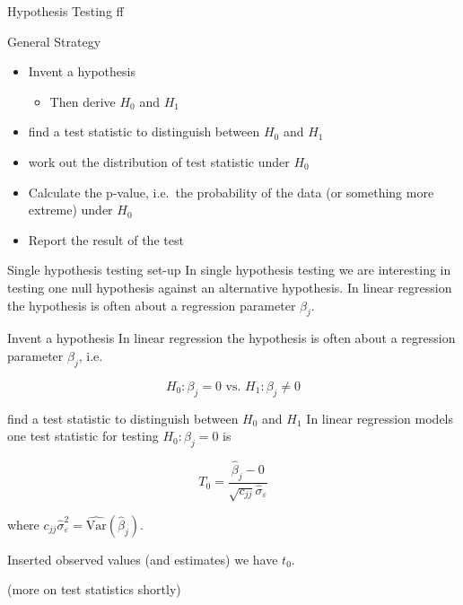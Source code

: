 \documentclass[
  ignorenonframetext,
]{beamer}
\providecommand{\tightlist}{%
  \setlength{\itemsep}{0pt}\setlength{\parskip}{0pt}}
\begin{document}
\begin{frame}{Hypothesis Testing}
\label{hypothesis-testing}
ff
\end{frame}

\begin{frame}{General Strategy}
\label{general-strategy}
\begin{itemize}
\tightlist
\item
  Invent a hypothesis

  \begin{itemize}
  \tightlist
  \item
    Then derive \(H_0\) and \(H_1\)
  \end{itemize}
\item
  find a test statistic to distinguish between \(H_0\) and \(H_1\)
\item
  work out the distribution of test statistic under \(H_0\)
\item
  Calculate the p-value, i.e.~the probability of the data (or something
  more extreme) under \(H_0\)
\item
  Report the result of the test
\end{itemize}
\end{frame}

\begin{frame}{Single hypothesis testing set-up}
\label{single-hypothesis-testing-set-up}
In single hypothesis testing we are interesting in testing one null
hypothesis against an alternative hypothesis. In linear regression the
hypothesis is often about a regression parameter \(\beta_j\).
\end{frame}

\begin{frame}{Invent a hypothesis}
\label{invent-a-hypothesis}
In linear regression the hypothesis is often about a regression
parameter \(\beta_j\), i.e.~

\[
H_0: \beta_j=0 \text{ vs. } H_1: \beta_j\neq 0
\]
\end{frame}

\begin{frame}{find a test statistic to distinguish between \(H_0\) and
\(H_1\)}
\label{find-a-test-statistic-to-distinguish-between-h_0-and-h_1}
In linear regression models one test statistic for testing
\(H_0: \beta_j=0\) is

\[
T_0=\frac{\hat{\beta}_j-0}{\sqrt{c_{jj}}\hat{\sigma}_{\varepsilon}}
\]

where
\(c_{jj}\hat{\sigma}_{\varepsilon}^2=\widehat{\text{Var}}(\hat{\beta}_j)\).

Inserted observed values (and estimates) we have \(t_0\).

(more on test statistics shortly)
\end{frame}
\end{document}
